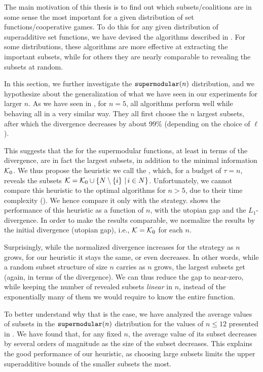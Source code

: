 The main motivation of this thesis is to find out which subsets/coalitions are in some sense the most important for a given distribution of set functions/cooperative games.
To do this for any given distribution of superadditive set functions, we have devised the algorithms described in .
For some distributions, these algorithms are more effective at extracting the important subsets, while for others they are nearly comparable to revealing the subsets at random. %

In this section, we further investigate the $ \texttt{supermodular}\!\left(n\right) $ distribution, and we hypothesize about the generalization of what we have seen in our experiments for larger $ n $.
As we have seen in , for $ n=5 $, all algorithms perform well while behaving all in a very similar way.
They all first choose the $ n $ largest subsets, after which the divergence decreases by about 99\% (depending on the choice of $ \ell $).

This suggests that the  for the supermodular functions, at least in terms of the divergence, are in fact the largest subsets, in addition to the minimal information $ \mathcal{K}_0 $.
We thus propose the heuristic we call the \algLC{}, which, for a budget of $ \tau = n $, reveals the subsets $ \mathcal{K} = \mathcal{K}_0 \cup \left\{ N \setminus \left\{ i \right\} \,|\, i \in N \right\} $.
Unfortunately, we cannot compare this heuristic to the optimal algorithms for $ n > 5 $,  due to their time complexity ().
We hence compare it only with the \algRand{} strategy.
 shows the performance of this heuristic as a function of $ n $, with the utopian gap and the $ L_1 $-divergence.
In order to make the results comparable, we normalize the results by the initial divergence (utopian gap), i.e., $ \mathcal{K} = \mathcal{K}_0 $ for each $n$.

Surprisingly, while the normalized divergence increases for the \algRand{} strategy as $ n $ grows, for our \algLC{} heuristic it stays the same, or even decreases.
In other words, while a random subset structure of size $ n $ carries  as $n$ grows, the largest subsets get  (again, in terms of the divergence).
We can thus reduce the gap to near-zero, while keeping the number of revealed subsets \emph{linear} in $ n $, instead of the exponentially many of them we would require to know the entire function.

To better understand why that is the case, we have analyzed the average values of subsets in the $ \texttt{supermodular}\!\left(n\right) $ distribution for the values of $ n \leq 12 $ presented in .
We have found that, for any fixed $ n $, the average value of its subset decreases by several orders of magnitude as the size of the subset decreases.
This explains the good performance of our heuristic, as choosing large subsets limits the upper superadditive bounds of the smaller subsets the most.
